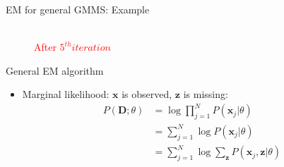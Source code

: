 \documentclass[12pt]{beamer}
\begin{document}
\begin{frame}{EM for general GMMS: Example}
\begin{figure}
{\textcolor{red}{\\After $5^{th} iteration$}
}
\end{figure}
\end{frame}

\begin{frame}{General EM algorithm}
\begin{itemize}
	\item Marginal likelihood: $\bm{x}$ is observed, $\bm{z}$ is missing:
	\begin{equation} \nonumber
	\begin{aligned}
	P(\mathbf{D};\theta) &=  \log\prod_{j=1}^{N}P(\bm{x}_j|\theta) \\
	&= \sum_{j=1}^{N} \log P(\bm{x}_j|\theta) \\
	&= \sum_{j=1}^{N} \log\sum_{\bm{z}}P(\bm{x}_j,\bm{z}|\theta)
	\end{aligned}
	\end{equation}
\end{itemize}
\end{frame}
\end{document}
